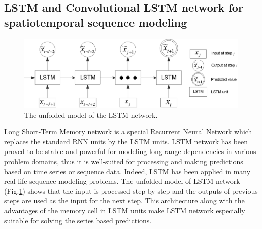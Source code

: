 \subsection{LSTM and Convolutional LSTM network for spatiotemporal sequence modeling}
\label{subsection:lstm_ConvLSTM}
\begin{figure}		\includegraphics[width=0.8\columnwidth]{preliminaries_figs/LSTM_model.eps}
		\caption{The unfolded model of the LSTM network. \label{fig:LSTM_model}}
\end{figure}
Long Short-Term Memory network is a special Recurrent Neural Network which replaces the standard RNN units by the LSTM units. 
LSTM network has been proved to be stable and powerful for modeling long-range dependencies in various problem domains, thus it is well-suited for processing and making predictions based on time series or sequence data.
Indeed, LSTM has been applied in many real-life sequence modeling problems. 
The unfolded model of LSTM network (Fig.\ref{fig:LSTM_model}) shows that the input is processed step-by-step and the outputs of previous steps are used as the input for the next step. This architecture along with the advantages of the memory cell in LSTM units make LSTM network especially suitable for solving the series based predictions.

